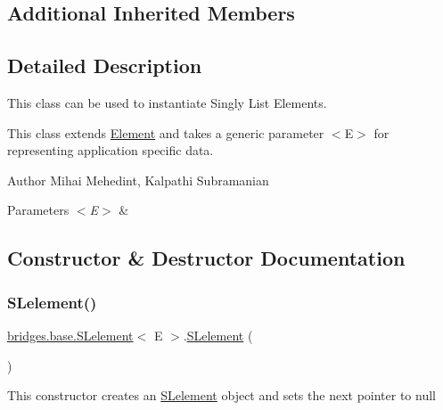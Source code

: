 \subsection*{Additional Inherited Members}


\subsection{Detailed Description}
This class can be used to instantiate Singly List Elements. 

This class extends \hyperlink{classbridges_1_1base_1_1_element}{Element} and takes a generic parameter $<$\+E$>$ for representing application specific data.

\begin{DoxyAuthor}{Author}
Mihai Mehedint, Kalpathi Subramanian
\end{DoxyAuthor}

\begin{DoxyParams}{Parameters}
{\em $<$\+E$>$} & \\
\hline
\end{DoxyParams}


\subsection{Constructor \& Destructor Documentation}
\hypertarget{classbridges_1_1base_1_1_s_lelement_ab9c8a08dadd76d7e0c29d7c41cf277c4}{}\label{classbridges_1_1base_1_1_s_lelement_ab9c8a08dadd76d7e0c29d7c41cf277c4} 
\subsubsection{\texorpdfstring{S\+Lelement()}{SLelement()}\hspace{0.1cm}{\footnotesize\ttfamily [1/4]}}
{\footnotesize\ttfamily \hyperlink{classbridges_1_1base_1_1_s_lelement}{bridges.\+base.\+S\+Lelement}$<$ E $>$.\hyperlink{classbridges_1_1base_1_1_s_lelement}{S\+Lelement} (\begin{DoxyParamCaption}{ }\end{DoxyParamCaption})}

This constructor creates an \hyperlink{classbridges_1_1base_1_1_s_lelement}{S\+Lelement} object and sets the next pointer to null \hypertarget{classbridges_1_1base_1_1_s_lelement_a8e32c9b9e8fc8f9f1eccb14b97e031e7}{}\label{classbridges_1_1base_1_1_s_lelement_a8e32c9b9e8fc8f9f1eccb14b97e031e7} 
